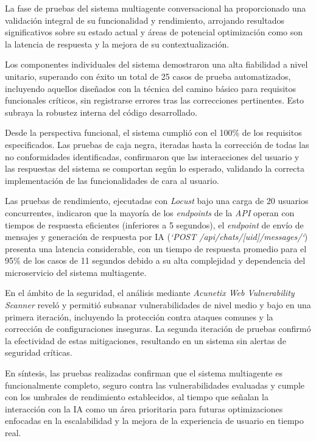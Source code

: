 La fase de pruebas del sistema multiagente conversacional ha proporcionado una validación integral de su funcionalidad y rendimiento, arrojando resultados significativos sobre su estado actual y áreas de potencial optimización como son la latencia de respuesta y la mejora de su contextualización.

Los componentes individuales del sistema demostraron una alta fiabilidad a nivel unitario, superando con éxito un total de 25 casos de prueba automatizados, incluyendo aquellos diseñados con la técnica del camino básico para requisitos funcionales críticos, sin registrarse errores tras las correcciones pertinentes. Esto subraya la robustez interna del código desarrollado.

Desde la perspectiva funcional, el sistema cumplió con el 100\% de los requisitos especificados. Las pruebas de caja negra, iteradas hasta la corrección de todas las no conformidades identificadas, confirmaron que las interacciones del usuario y las respuestas del sistema se comportan según lo esperado, validando la correcta implementación de las funcionalidades de cara al usuario.

Las pruebas de rendimiento, ejecutadas con \textit{Locust} bajo una carga de 20 usuarios concurrentes, indicaron que la mayoría de los \textit{endpoints} de la \textit{API} operan con tiempos de respuesta eficientes (inferiores a 5 segundos), el \textit{endpoint} de envío de mensajes y generación de respuesta por IA (\textit{`POST /api/chats/[uid]/messages/`}) presenta una latencia considerable, con un tiempo de respuesta promedio para el 95\% de los casos de 11 segundos debido a su alta complejidad y dependencia del microservicio del sistema multiagente.

En el ámbito de la seguridad, el análisis mediante \textit{Acunetix Web Vulnerability Scanner} reveló y permitió subsanar vulnerabilidades de nivel medio y bajo en una primera iteración, incluyendo la protección contra ataques comunes y la corrección de configuraciones inseguras. La segunda iteración de pruebas confirmó la efectividad de estas mitigaciones, resultando en un sistema sin alertas de seguridad críticas.  

En síntesis, las pruebas realizadas confirman que el sistema multiagente es funcionalmente completo, seguro contra las vulnerabilidades evaluadas y cumple con los umbrales de rendimiento establecidos, al tiempo que señalan la interacción con la IA como un área prioritaria para futuras optimizaciones enfocadas en la escalabilidad y la mejora de la experiencia de usuario en tiempo real.